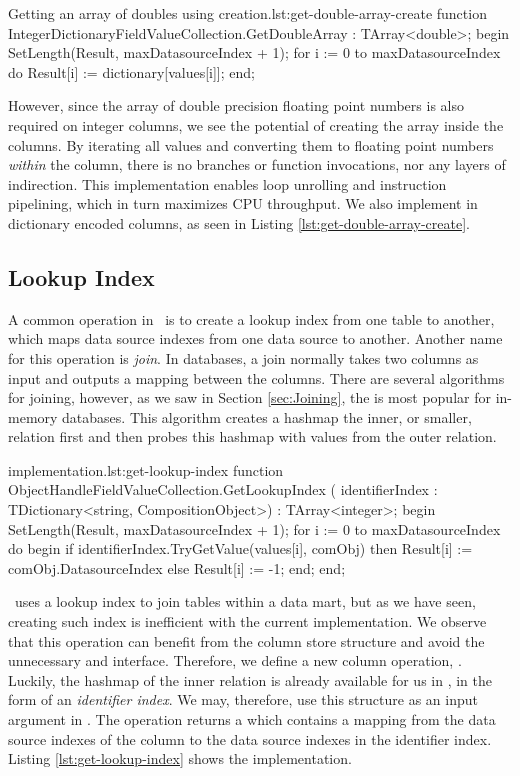 \begin{delphicode}{Getting an array of doubles using creation.}{lst:get-double-array-create}
function IntegerDictionaryFieldValueCollection.GetDoubleArray
: TArray<double>;
begin
  SetLength(Result, maxDatasourceIndex + 1);
  for i := 0 to maxDatasourceIndex do
    Result[i] := dictionary[values[i]];
end;
\end{delphicode}
However, since the array of double precision floating point numbers is also required on integer columns, we see the potential of creating the array inside the columns. By iterating all values and converting them to floating point numbers \textit{within} the column, there is no branches or function invocations, nor any layers of indirection. This implementation enables loop unrolling and instruction pipelining, which in turn maximizes CPU throughput. We also implement  in dictionary encoded columns, as seen in Listing \ref{lst:get-double-array-create}.

\subsection{Lookup Index}
\label{sub:Lookup Index}
A common operation in \bd~is to create a lookup index from one table to another, which maps data source indexes from one data source to another. Another name for this operation is \textit{join}. In databases, a join normally takes two columns as input and outputs a mapping between the columns. There are several algorithms for joining, however, as we saw in Section \ref{sec:Joining}, the  is most popular for in-memory databases. This algorithm creates a hashmap the inner, or smaller, relation first and then probes this hashmap with values from the outer relation.

\begin{delphicode}{ implementation.}{lst:get-lookup-index}
function ObjectHandleFieldValueCollection.GetLookupIndex
( identifierIndex : TDictionary<string, CompositionObject>)
: TArray<integer>;
begin
  SetLength(Result, maxDatasourceIndex + 1);
  for i := 0 to maxDatasourceIndex do
  begin
    if identifierIndex.TryGetValue(values[i], comObj) then
      Result[i] := comObj.DatasourceIndex
    else
      Result[i] := -1;
  end;
end;
\end{delphicode}
\gd~uses a lookup index to join tables within a data mart, but as we have seen, creating such index is inefficient with the current implementation. We observe that this operation can benefit from the column store structure and avoid the unnecessary  and  interface. Therefore, we define a new column operation, . Luckily, the hashmap of the inner relation is already available for us in \gap, in the form of an \textit{identifier index}. We may, therefore, use this structure as an input argument in . The operation returns a  which contains a mapping from the data source indexes of the column to the data source indexes in the identifier index. Listing \ref{lst:get-lookup-index} shows the implementation.


